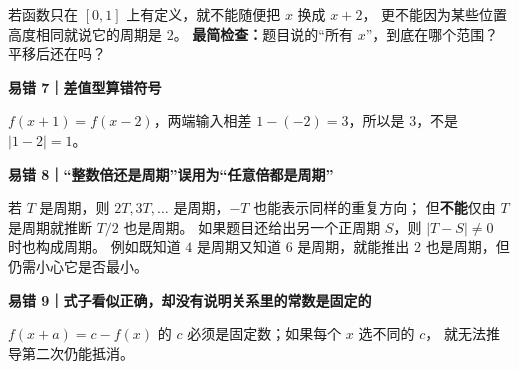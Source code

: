 \begin{trapbox}
若函数只在 $[0,1]$ 上有定义，就不能随便把 $x$ 换成 $x+2$，
更不能因为某些位置高度相同就说它的周期是 $2$。
\textbf{最简检查：}题目说的“所有 $x$”，到底在哪个范围？平移后还在吗？

\medskip
\end{trapbox}\clearpage\begin{trapbox}\textbf{易错 7｜差值型算错符号}



$f(x+1)=f(x-2)$，两端输入相差
$1-(-2)=3$，所以是 $3$，不是 $|1-2|=1$。

\medskip
\end{trapbox}\clearpage\begin{trapbox}\textbf{易错 8｜“整数倍还是周期”误用为“任意倍都是周期”}



若 $T$ 是周期，则 $2T,3T,\ldots$ 是周期，$-T$ 也能表示同样的重复方向；
但\textbf{不能}仅由 $T$ 是周期就推断 $T/2$ 也是周期。
如果题目还给出另一个正周期 $S$，则 $|T-S|\ne0$ 时也构成周期。
例如既知道 $4$ 是周期又知道 $6$ 是周期，就能推出 $2$ 也是周期，但仍需小心它是否最小。

\medskip
\end{trapbox}\clearpage\begin{trapbox}\textbf{易错 9｜式子看似正确，却没有说明关系里的常数是固定的}



$f(x+a)=c-f(x)$ 的 $c$ 必须是固定数；如果每个 $x$ 选不同的 $c$，
就无法推导第二次仍能抵消。
\end{trapbox}
